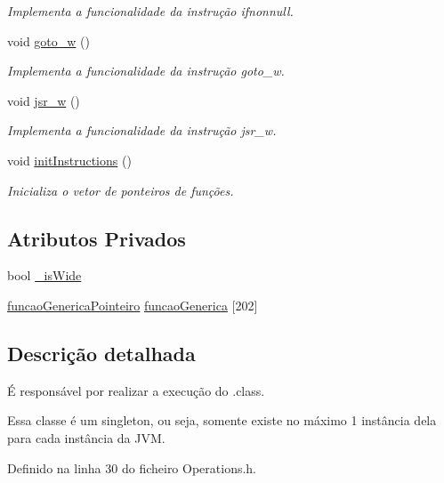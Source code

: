 \begin{DoxyCompactItemize}
\begin{DoxyCompactList}\small\item\em Implementa a funcionalidade da instrução ifnonnull. \end{DoxyCompactList}\item 
void \hyperlink{classOperations_aed8436ead5dfcaef69b24e1b2fff7744}{goto\+\_\+w} ()
\begin{DoxyCompactList}\small\item\em Implementa a funcionalidade da instrução goto\+\_\+w. \end{DoxyCompactList}\item 
void \hyperlink{classOperations_a22241dabd3678c4ab77bbe5882c3a4db}{jsr\+\_\+w} ()
\begin{DoxyCompactList}\small\item\em Implementa a funcionalidade da instrução jsr\+\_\+w. \end{DoxyCompactList}\item 
void \hyperlink{classOperations_ae0d60fc4bf4279ae24bdb47cb3634045}{init\+Instructions} ()
\begin{DoxyCompactList}\small\item\em Inicializa o vetor de ponteiros de funções. \end{DoxyCompactList}\end{DoxyCompactItemize}
\subsection*{Atributos Privados}
\begin{DoxyCompactItemize}
\item 
bool \hyperlink{classOperations_ab20aea5d0327c8100d12b217ecbbd62c}{\+\_\+is\+Wide}
\item 
\hyperlink{Operations_8h_a40aa26aea6df6f70ca74e7547328d316}{funcao\+Generica\+Pointeiro} \hyperlink{classOperations_a5576f742afb9d43d3ea33f2ddd33fd43}{funcao\+Generica} \mbox{[}202\mbox{]}
\end{DoxyCompactItemize}


\subsection{Descrição detalhada}
É responsável por realizar a execução do .class. 

Essa classe é um singleton, ou seja, somente existe no máximo 1 instância dela para cada instância da J\+VM. 

Definido na linha 30 do ficheiro Operations.\+h.



